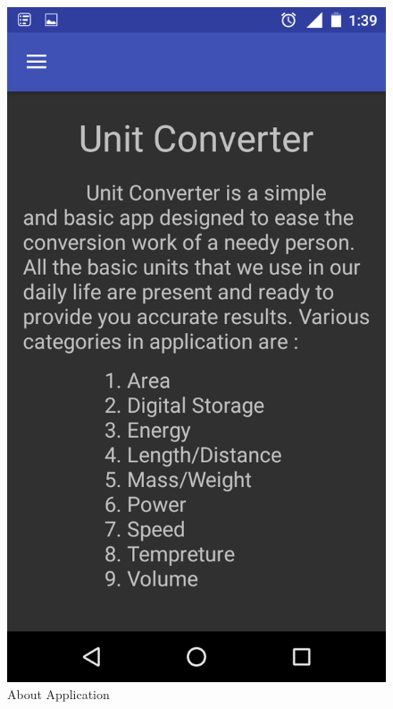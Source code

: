 \documentclass[a4paper, 12pt]{report}
\begin{document}
\begin{center}
\begin{figure}
\centering
\includegraphics[scale = 0.35]{./ss3}
\caption{About Application}
\end{figure}
\end{center}
\end{document}
